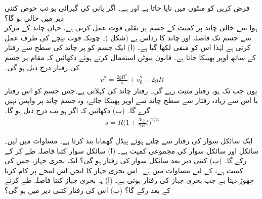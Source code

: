 فرض کریں  کو منٹوں میں ناپا جاتا ہے اور  ہے۔  اگر پانی کی گہرائی  ہو تب حوض کتنی دیر میں  خالی ہو گا؟ 
\\
ہوا سے خالی چاند پر کمیت  کے جسم پر ثقلی قوت  عمل کرتی ہے،  جہاں  چاند کے مرکز سے جسم تک فاصلہ  اور چاند کا رداس  ہے
 (شکل )۔ چونکہ قوت  نیچے  کی طرف  عمل کرتی ہے لہٰذا اس کو  منفی لکھا گیا ہے۔ (ا) ایک جسم کو  پر چاند  کی سطح سے   رفتار کے ساتھ اوپر پھینکا جاتا ہے۔ قانون نیوٹن  استعمال کرتے ہوئے  دکھائیں کہ مقام  پر جسم کی رفتار درج ذیل ہو گی۔
\begin{align*}
v^2=\frac{2gR^2}{s}+v_0^2-2gR
\end{align*} 
یوں جب تک  ہو، رفتار مثبت رہے گی۔ رفتار  چاند کی  کہلاتی ہے۔جس جسم کو  اس رفتار یا اس سے زیادہ رفتار سے سطح چاند سے اوپر پھینکا جائے، وہ جسم چاند پر واپس نہیں گرے گا۔ (ب) دکھائیں کہ اگر  ہو تب درج ذیل ہو گا۔
\begin{align*}
s=R\big(1+\frac{3v_0}{2R}t\big)^{2/3}
\end{align*} 

ایک سائکل سوار   کی رفتار سے چلتے ہوئے پیڈل گھمانا بند کرتا ہے۔ مساوات  میں  لیں۔ سائکل اور  سائکل سوار کی  مجموعی کمیت  ہے۔  (ا) سائکل سوار  کتنا فاصلہ طے کر کے رکے گا۔ (ب) کتنی دیر بعد سائکل سوار کی رفتار  ہو گی؟
ایک بحری جہاز،  جس کی کمیت  ہے، کے لیے  مساوات  میں  ہے۔ اس بحری جہاز کا انجن اس لمحے  پر  کام کرنا چھوڑ دیتا ہے جب بحری جہاز  کی رفتار  ہوتی ہے۔ (ا) یہ بحری جہاز کتنا فاصلہ طے کرنے کے بعد رکے گا؟ (ب) اس کی رفتار کتنی دیر میں    ہو گی؟

